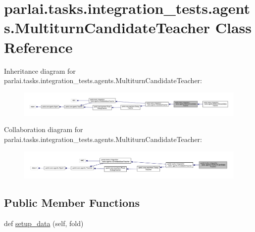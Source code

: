 \hypertarget{classparlai_1_1tasks_1_1integration__tests_1_1agents_1_1MultiturnCandidateTeacher}{}\section{parlai.\+tasks.\+integration\+\_\+tests.\+agents.\+Multiturn\+Candidate\+Teacher Class Reference}
\label{classparlai_1_1tasks_1_1integration__tests_1_1agents_1_1MultiturnCandidateTeacher}


Inheritance diagram for parlai.\+tasks.\+integration\+\_\+tests.\+agents.\+Multiturn\+Candidate\+Teacher\+:\nopagebreak
\begin{figure}[H]
\begin{center}
\leavevmode
\includegraphics[width=350pt]{d1/d67/classparlai_1_1tasks_1_1integration__tests_1_1agents_1_1MultiturnCandidateTeacher__inherit__graph}
\end{center}
\end{figure}


Collaboration diagram for parlai.\+tasks.\+integration\+\_\+tests.\+agents.\+Multiturn\+Candidate\+Teacher\+:\nopagebreak
\begin{figure}[H]
\begin{center}
\leavevmode
\includegraphics[width=350pt]{da/d2e/classparlai_1_1tasks_1_1integration__tests_1_1agents_1_1MultiturnCandidateTeacher__coll__graph}
\end{center}
\end{figure}
\subsection*{Public Member Functions}
\begin{DoxyCompactItemize}
\item 
def \hyperlink{classparlai_1_1tasks_1_1integration__tests_1_1agents_1_1MultiturnCandidateTeacher_aed2bfff52c3db13cb2a0d2acf41fdb8f}{setup\+\_\+data} (self, fold)
\end{DoxyCompactItemize}
